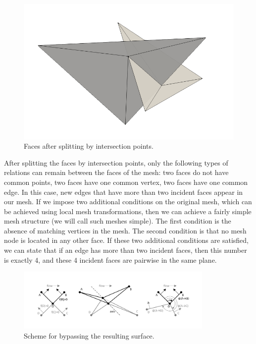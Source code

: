 \begin{figure}[h]
\centering
\includegraphics[width=\textwidth]{pics/text_1_int/pic_after_cut.png}
\caption{Faces after splitting by intersection points.}\label{fig:pic_after_cut}
\end{figure}

After splitting the faces by intersection points, only the following types of relations can remain between the faces of the mesh: two faces do not have common points, two faces have one common vertex, two faces have one common edge.
In this case, new edges that have more than two incident faces appear in our mesh.
If we impose two additional conditions on the original mesh, which can be achieved using local mesh transformations, then we can achieve a fairly simple mesh structure (we will call such meshes simple).
The first condition is the absence of matching vertices in the mesh.
The second condition is that no mesh node is located in any other face.
If these two additional conditions are satisfied, we can state that if an edge has more than two incident faces, then this number is exactly 4, and these 4 incident faces are pairwise in the same plane.

\begin{figure}[h]
\centering
\includegraphics[width=0.85\textwidth]{pics/text_1_int/pic_walk_1.pdf}
\caption{Scheme for bypassing the resulting surface.}\label{fig:pic_walk}
\end{figure}

